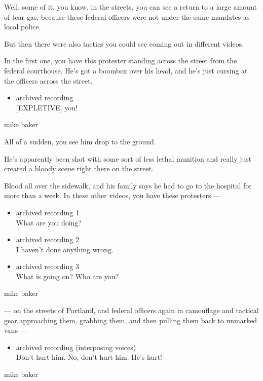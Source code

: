 Well, some of it, you know, in the streets, you can see a return to a
large amount of tear gas, because these federal officers were not under
the same mandates as local police.

But then there were also tactics you could see coming out in different
videos.

In the first one, you have this protester standing across the street
from the federal courthouse. He's got a boombox over his head, and he's
just cursing at the officers across the street.

\begin{itemize}
\tightlist
\item
  archived recording\\
  {[}EXPLETIVE{]} you!
\end{itemize}

mike baker

All of a sudden, you see him drop to the ground.

He's apparently been shot with some sort of less lethal munition and
really just created a bloody scene right there on the street.

Blood all over the sidewalk, and his family says he had to go to the
hospital for more than a week. In these other videos, you have these
protesters ---

\begin{itemize}
\item
  archived recording 1\\
  What are you doing?
\item
  archived recording 2\\
  I haven't done anything wrong.
\item
  archived recording 3\\
  What is going on? Who are you?
\end{itemize}

mike baker

--- on the streets of Portland, and federal officers again in camouflage
and tactical gear approaching them, grabbing them, and then pulling them
back to unmarked vans ---

\begin{itemize}
\tightlist
\item
  archived recording (interposing voices)\\
  Don't hurt him. No, don't hurt him. He's hurt!
\end{itemize}

mike baker

